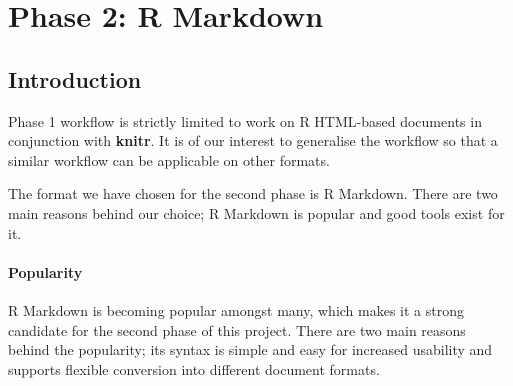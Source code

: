 \documentclass[a4paper, 12pt]{report}
\begin{document}
\chapter{Phase 2: R Markdown}
\begin{figure}[h]
\centering
\end{figure}

\section{Introduction}
Phase 1 workflow is strictly limited to work on R HTML-based documents in conjunction with \textbf{knitr}. It is of our interest to generalise the workflow so that a similar workflow can be applicable on other formats.

The format we have chosen for the second phase is R Markdown. There are two main reasons behind our choice; R Markdown is popular and good tools exist for it.

\subsubsection*{Popularity}
R Markdown is becoming popular amongst many, which makes it a strong candidate for the second phase of this project. There are two main reasons behind the popularity; its syntax is simple and easy for increased usability and supports flexible conversion into different document formats.
\end{document}
